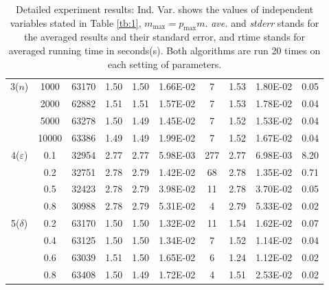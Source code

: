 \documentclass{scrartcl}
\begin{document}
\begin{table}[h]
\begin{tabularx}{\textwidth}{c|c|c|c|ccc|ccc}
\midrule
3($n$) & 1000 & 63170 & 1.50 & 1.50 & 1.66E-02 & 7 & 1.53 & 1.80E-02 & 0.05 \\
 & 2000 & 62882 & 1.51 & 1.51 & 1.57E-02 & 7 & 1.53 & 1.78E-02 & 0.04\\
 & 5000 & 63278 & 1.50 & 1.49 & 1.45E-02 & 7 & 1.52 & 1.53E-02 & 0.04\\
 & 10000 & 63386 & 1.49 & 1.49 & 1.99E-02 & 7 & 1.52 & 1.67E-02 & 0.04\\
\midrule
4($\varepsilon$) & 0.1 & 32954 & 2.77 & 2.77 & 5.98E-03 & 277 & 2.77 & 6.98E-03 & 8.20\\
 & 0.2 & 32751 & 2.78 & 2.79 & 1.42E-02 & 68 & 2.78 & 1.35E-02 & 0.71\\
 & 0.5 & 32423 & 2.78 & 2.79 & 3.98E-02 & 11 & 2.78 & 3.70E-02 & 0.05\\
 & 0.8 & 30988 & 2.78 & 2.79 & 5.31E-02 & 4 & 2.79 & 5.33E-02 & 0.02\\
\midrule
5($\delta$) & 0.2 & 63170 & 1.50 & 1.50 & 1.32E-02 & 11 & 1.54 & 1.62E-02 & 0.07\\
 & 0.4 & 63125 & 1.50 & 1.50 & 1.34E-02 & 7 & 1.52 & 1.14E-02 & 0.04\\
 & 0.6 & 63039 & 1.51 & 1.50 & 1.65E-02 & 6 & 1.24 & 1.12E-02 & 0.02\\
 & 0.8 & 63408 & 1.50 & 1.49 & 1.72E-02 & 4 & 1.51 & 2.53E-02 & 0.02\\
\bottomrule
\end{tabularx}
\caption{Detailed experiment results: Ind. Var. shows the values of independent variables stated in Table \ref{tb:1}, $m_{\max}=p_{\max}m$. \emph{ave.} and \emph{stderr} stands for the averaged results and their standard error, and rtime stands for averaged running time in seconds(s). Both algorithms are run 20 times on each setting of parameters.}
\label{tb:2}
\end{table}

\end{document}
